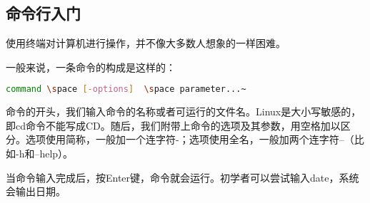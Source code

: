 \subsection{命令行入门}
使用终端对计算机进行操作，并不像大多数人想象的一样困难。

一般来说，一条命令的构成是这样的：
\begin{lstlisting}[language=bash]
command \space [-options]  \space parameter...~
\end{lstlisting}

命令的开头，我们输入命令的名称或者可运行的文件名。Linux是大小写敏感的，即cd命令不能写成CD。随后，我们附带上命令的选项及其参数，用空格加以区分。选项使用简称，一般加一个连字符-；选项使用全名，一般加两个连字符--（比如-h和--help）。

当命令输入完成后，按Enter键，命令就会运行。初学者可以尝试输入date，系统会输出日期。


